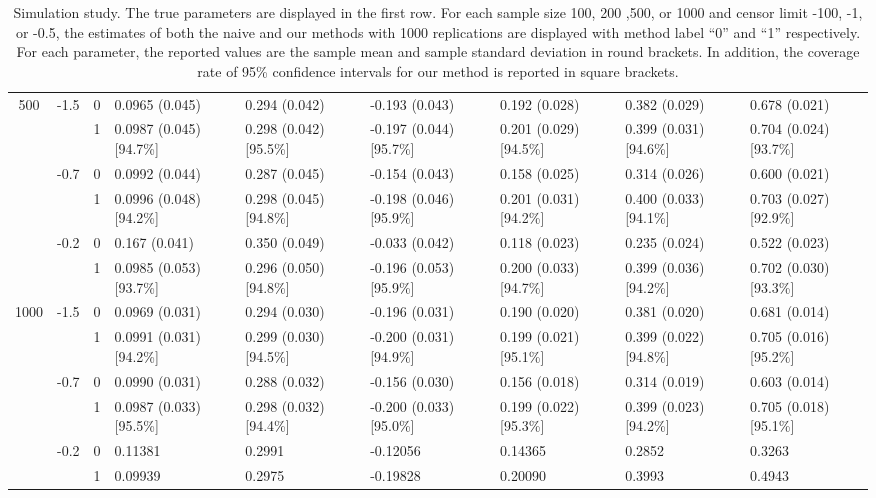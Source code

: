 \documentclass[a4paper,12pt]{article}
\begin{document}
\begin{landscape}
\begin{table}
\begin{tabular}{cccllllll}
\hline
\multirow{6}{*}{500} & 
\multirow{2}{*}{-1.5} & 0 & 0.0965 (0.045)  &0.294 (0.042)  &-0.193 (0.043)  &0.192 (0.028) &0.382 (0.029)   &0.678 (0.021) \\
&                       & 1 & 0.0987 (0.045) [94.7\%]   &0.298 (0.042) [95.5\%]  &-0.197 (0.044) [95.7\%]  &0.201 (0.029) [94.5\%] &0.399 (0.031) [94.6\%]  &0.704 (0.024) [93.7\%]\\
& \multirow{2}{*}{-0.7} & 0 & 0.0992 (0.044)  &0.287 (0.045)  &-0.154 (0.043)  &0.158 (0.025) &0.314 (0.026)  &0.600 (0.021)\\
&                       & 1 & 0.0996 (0.048) [94.2\%]   &0.298 (0.045) [94.8\%]  &-0.198 (0.046) [95.9\%]  &0.201 (0.031) [94.2\%]  &0.400 (0.033) [94.1\%]  &0.703 (0.027) [92.9\%]\\
& \multirow{2}{*}{-0.2} & 0 & 0.167 (0.041)  &0.350 (0.049)  &-0.033 (0.042)  &0.118 (0.023) &0.235 (0.024)  &0.522 (0.023)\\
&                       & 1 & 0.0985 (0.053) [93.7\%] &0.296 (0.050) [94.8\%]  &-0.196 (0.053) [95.9\%]  &0.200 (0.033) [94.7\%] &0.399 (0.036) [94.2\%]  &0.702 (0.030) [93.3\%]\\

\hline
\multirow{6}{*}{1000} & 
\multirow{2}{*}{-1.5}   & 0 & 0.0969 (0.031)  &0.294 (0.030)  &-0.196 (0.031)  &0.190 (0.020) &0.381 (0.020)   &0.681 (0.014) \\
&                       & 1 & 0.0991 (0.031) [94.2\%]   &0.299 (0.030) [94.5\%]  &-0.200 (0.031) [94.9\%]  &0.199 (0.021) [95.1\%] &0.399 (0.022) [94.8\%]  &0.705 (0.016) [95.2\%]\\
& \multirow{2}{*}{-0.7} & 0 & 0.0990 (0.031)  &0.288 (0.032)  &-0.156 (0.030)   &0.156 (0.018)  &0.314 (0.019)  &0.603 (0.014)\\
&                       & 1 & 0.0987 (0.033) [95.5\%]   &0.298 (0.032) [94.4\%]  &-0.200 (0.033) [95.0\%]  &0.199 (0.022) [95.3\%]  &0.399 (0.023) [94.2\%]  &0.705 (0.018) [95.1\%]\\\
& \multirow{2}{*}{-0.2} & 0 & 0.11381   &0.2991   &-0.12056   &0.14365  &0.2852   &0.3263 \\
&                       & 1 & 0.09939   &0.2975   &-0.19828   &0.20090  &0.3993   &0.4943 \\


\hline
\hline
\end{tabular}
\caption{Simulation study. The true parameters are displayed in the first row. For each sample size 100, 200 ,500, or 1000 and censor limit -100, -1, or -0.5, the estimates of both the naive and our methods with 1000 replications are displayed with method label ``0'' and ``1'' respectively. For each parameter, the reported values are the sample mean and sample standard deviation in round brackets. In addition, the coverage rate of 95\% confidence intervals for our method is reported in square brackets.}
\label{tab:sim}
\end{table}
\end{landscape}
\end{document}
